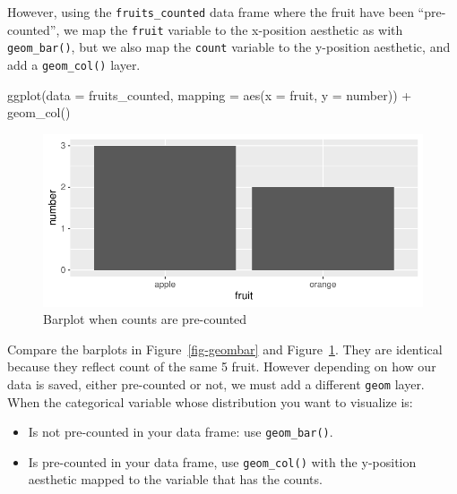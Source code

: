 \documentclass[
  letterpaper,
  DIV=11,
  numbers=noendperiod]{scrreprt}
\newenvironment{Shaded}{\begin{snugshade}}{\end{snugshade}}
\newcommand{\AttributeTok}[1]{\textcolor[rgb]{0.40,0.45,0.13}{#1}}
\newcommand{\FunctionTok}[1]{\textcolor[rgb]{0.28,0.35,0.67}{#1}}
\newcommand{\NormalTok}[1]{\textcolor[rgb]{0.00,0.23,0.31}{#1}}
\newcommand{\SpecialCharTok}[1]{\textcolor[rgb]{0.37,0.37,0.37}{#1}}
\providecommand{\tightlist}{%
  \setlength{\itemsep}{0pt}\setlength{\parskip}{0pt}}\usepackage{longtable,booktabs,array}
\theoremstyle{definition}
\theoremstyle{remark}
\begin{document}
However, using the \texttt{fruits\_counted} data frame where the fruit
have been ``pre-counted'', we map the \texttt{fruit} variable to the
x-position aesthetic as with \texttt{geom\_bar()}, but we also map the
\texttt{count} variable to the y-position aesthetic, and add a
\texttt{geom\_col()} layer.

\begin{Shaded}
\begin{Highlighting}[]
\FunctionTok{ggplot}\NormalTok{(}\AttributeTok{data =}\NormalTok{ fruits\_counted, }\AttributeTok{mapping =} \FunctionTok{aes}\NormalTok{(}\AttributeTok{x =}\NormalTok{ fruit, }\AttributeTok{y =}\NormalTok{ number)) }\SpecialCharTok{+}
  \FunctionTok{geom\_col}\NormalTok{()}
\end{Highlighting}
\end{Shaded}

\begin{figure}[H]

{\centering \includegraphics{02-visualization_files/figure-pdf/fig-geomcol-1.pdf}

}

\caption{\label{fig-geomcol}Barplot when counts are pre-counted}

\end{figure}

Compare the barplots in Figure~\ref{fig-geombar} and
Figure~\ref{fig-geomcol}. They are identical because they reflect count
of the same 5 fruit. However depending on how our data is saved, either
pre-counted or not, we must add a different \texttt{geom} layer. When
the categorical variable whose distribution you want to visualize is:

\begin{itemize}
\tightlist
\item
  Is not pre-counted in your data frame: use \texttt{geom\_bar()}.
\item
  Is pre-counted in your data frame, use \texttt{geom\_col()} with the
  y-position aesthetic mapped to the variable that has the counts.
\end{itemize}
\end{document}
